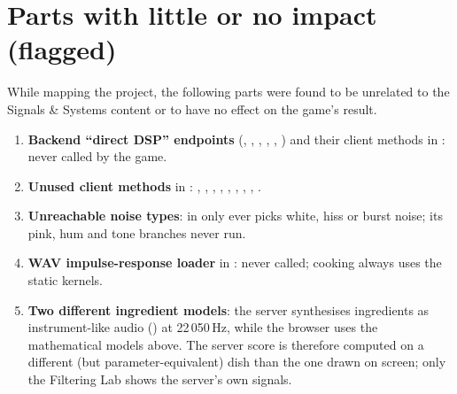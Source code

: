 \documentclass[11pt,a4paper]{article}
\begin{document}
\section{Parts with little or no impact (flagged)}\label{sec:flags}
While mapping the project, the following parts were found to be unrelated to the
Signals \& Systems content or to have no effect on the game's result.

\begin{flagbox}
\begin{enumerate}[leftmargin=*]
\item \textbf{Backend ``direct DSP'' endpoints} (, ,
  , , , ) and their
  client methods in : never called by the game.
\item \textbf{Unused client methods} in : ,
  , , , ,
  , , , .
\item \textbf{Unreachable noise types}:  in 
  only ever picks white, hiss or burst noise; its pink, hum and tone branches never run.
\item \textbf{WAV impulse-response loader}  in
  : never called; cooking always uses the static
  kernels.
\item \textbf{Two different ingredient models}: the server synthesises ingredients as
  instrument-like audio () at 22\,050\,Hz, while the
  browser uses the mathematical models above. The server score is therefore computed on
  a different (but parameter-equivalent) dish than the one drawn on screen; only the
  Filtering Lab shows the server's own signals.
\end{enumerate}
\end{flagbox}

\end{document}
